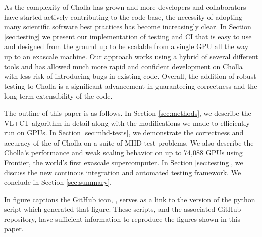 As the complexity of Cholla has grown and more developers and collaborators have started actively contributing to the code base, the necessity of adopting many scientific software best practices has become increasingly clear. In Section \ref{sec:testing} we present our implementation of testing and CI that is easy to use and designed from the ground up to be scalable from a single GPU all the way up to an exascale machine. Our approach works using a hybrid of several different tools and has allowed much more rapid and confident development on Cholla with less risk of introducing bugs in existing code. Overall, the addition of robust testing to Cholla is a significant advancement in guaranteeing correctness and the long term extensibility of the code.

The outline of this paper is as follows. In Section \ref{sec:methods}, we describe the VL+CT algorithm in detail along with the modifications we made to efficiently run on GPUs. In Section \ref{sec:mhd-tests}, we demonstrate the correctness and accuracy of the of Cholla on a suite of MHD test problems. We also  describe the Cholla's performance and weak scaling behavior on up to 74,088 GPUs using Frontier, the world's first exascale supercomputer. In Section \ref{sec:testing}, we discuss the new continous integration and automated testing framework. We conclude in Section \ref{sec:summary}. 

In figure captions the GitHub icon, , serves as a link to the version of the python script which generated that figure. These scripts, and the associated GitHub repository, have sufficient information to reproduce the figures shown in this paper.